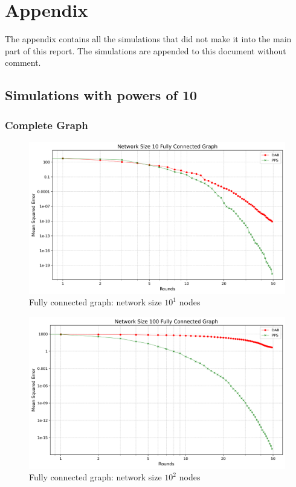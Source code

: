 \chapter{Appendix}\label{chap:appendix}
The appendix contains all the simulations that did not make it into the main part of this report. The simulations are appended to this document without comment.
\section{Simulations with powers of 10}
\subsection{Complete Graph}
\begin{figure}[H]
    \centering
    \includegraphics[scale=0.5]{figures/completeGraphSimulations/DAB_vs_PPS_FCG_r50_n10.png}
    \caption{Fully connected graph: network size $10^{1}$ nodes}
    \label{fig:10CompleteGraph}
\end{figure}
\begin{figure}[H]
    \centering
    \includegraphics[scale=0.5]{figures/completeGraphSimulations/DAB_vs_PPS_FCG_r50_n100.png}
    \caption{Fully connected graph: network size $10^{2}$ nodes}
    \label{fig:100CompleteGraph}
\end{figure}
